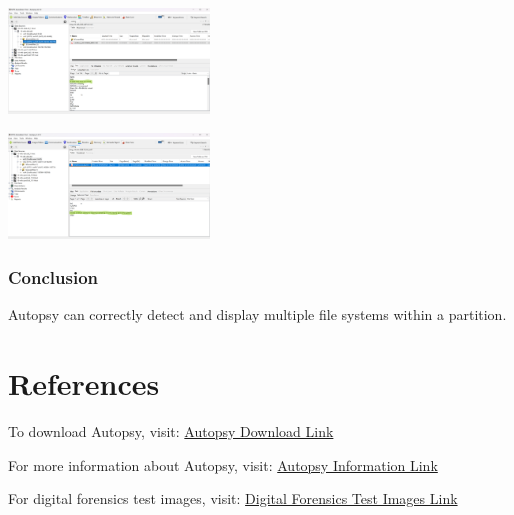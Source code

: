 \documentclass{extarticle}
\begin{document}
\begin{center}
    \includegraphics[width=0.4\textwidth]{6/6.5/Autopsy NTFS Autodetect-1.png}
\end{center}

\begin{center}
    \includegraphics[width=0.4\textwidth]{6/6.5/Autopsy NTFS Autodetect-2.png}
\end{center}

\subsubsection*{Conclusion}
Autopsy can correctly detect and display multiple file systems within a partition.

\section{References}

To download Autopsy, visit: \href{https://www.autopsy.com/download/}{Autopsy Download Link} 

For more information about Autopsy, visit: \href{http://www.sleuthkit.org/autopsy/}{Autopsy Information Link} 

For digital forensics test images, visit: \href{https://dftt.sourceforge.net/}{Digital Forensics Test Images Link}
\end{document}
